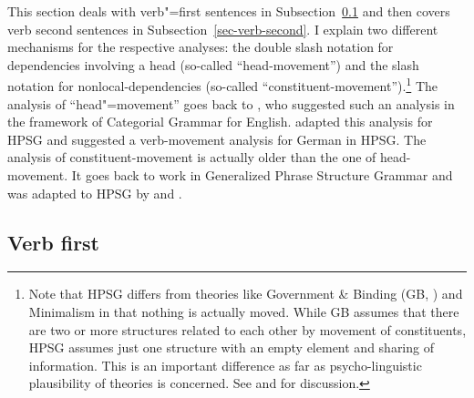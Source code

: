This section deals with verb"=first sentences in Subsection~\ref{sec-verb-first} and then covers verb
second sentences in Subsection~\ref{sec-verb-second}. I explain two different mechanisms for the
respective analyses: the double slash notation for dependencies involving a head (so-called ``head-movement'') and the slash notation
for nonlocal-dependencies (so-called ``constituent-movement'').\footnote{
  Note that HPSG differs from theories like Government \& Binding (GB, \citealt{Chomsky81a}) and
  Minimalism \citep{Chomsky95a-u} in that nothing is
  actually moved. While GB assumes that there are two or more structures related to each other by
  movement of constituents, HPSG assumes just one structure with an empty element and sharing of
  information. This is an important difference as far as psycho-linguistic plausibility of theories
  is concerned. See  and  for discussion.
}
The analysis of ``head"=movement'' goes back to \citet{Jacobson87}, who suggested such an analysis
in the framework of Categorial Grammar for English. \citet{Borsley89} adapted this analysis for HPSG
and \citet{KW91a,Kiss95a,Kiss95b} suggested a verb-movement analysis for German in HPSG. The analysis of
constituent-movement is actually older than the one of head-movement. It goes back to work in
Generalized Phrase Structure Grammar \citep{Gazdar81a} and was adapted to HPSG by \citet[Section~3.4]{ps} and \citet[Chapter~4]{ps2}. 

\subsection{Verb first}
\label{sec-verb-first}

